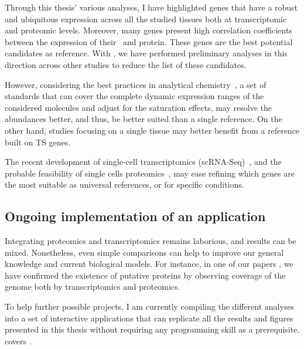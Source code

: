 Through this thesis' various analyses,
I have highlighted genes that have a robust and ubiquitous expression
across all the studied tissues
both at transcriptomic and proteomic levels.
Moreover, many genes present high correlation coefficients
between the expression of their \mRNA\ and protein.
These genes are the best potential candidates as reference.
With \nuno, we have performed preliminary analyses
in this direction across other studies
to reduce the list of these candidates.\mybr\

However,
considering the best practices in analytical chemistry~,
a set of standards that can cover the complete dynamic expression ranges
of the considered molecules
and adjust for the saturation effects,
may resolve the abundances better,
and thus, be better suited than a single reference.
On the other hand, studies focusing on a single tissue
may better benefit from a reference built on \gls{TS} genes.\mybr\

The recent development of single-cell transcriptomics
(scRNA-Seq)~,
and the probable feasibility of single cells proteomics~,
may ease refining which genes are the most suitable as universal references,
or for specific conditions.\mybr\


\subsection*{Ongoing implementation of an application}
\vspace{-6mm}
Integrating proteomics and transcriptomics remains laborious,
and results can be mixed.
Nonetheless,
even simple comparisons %
can help to improve our general knowledge
and current biological models.
For instance, in one of our papers %
,
we have confirmed the existence of putative proteins
by observing coverage of the genome both by transcriptomics and proteomics.\mybr\

To help further possible projects,
I am currently compiling the different analyses
into a set of interactive applications
that can replicate all the results and figures presented in this thesis
without requiring any programming skill as a prerequisite.
 covers .\mybr\

